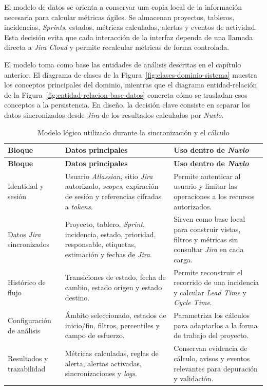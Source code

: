 El modelo de datos se orienta a conservar una copia local de la información necesaria para calcular métricas ágiles. Se almacenan proyectos, tableros, incidencias, \textit{Sprints}, estados, métricas calculadas, alertas y eventos de actividad. Esta decisión evita que cada interacción de la interfaz dependa de una llamada directa a \textit{Jira Cloud} y permite recalcular métricas de forma controlada.

El modelo toma como base las entidades de análisis descritas en el capítulo anterior. El diagrama de clases de la Figura~\ref{fig:clases-dominio-sistema} muestra los conceptos principales del dominio, mientras que el diagrama entidad-relación de la Figura~\ref{fig:entidad-relacion-base-datos} concreta cómo se trasladan esos conceptos a la persistencia. En diseño, la decisión clave consiste en separar los datos sincronizados desde \textit{Jira} de los resultados calculados por \textit{Nuvlo}.

{\renewcommand{\arraystretch}{1.22}\footnotesize
\begin{longtable}{p{3.4cm}p{5.0cm}p{5.0cm}}
\caption{Modelo lógico utilizado durante la sincronización y el cálculo}\label{tab:modelo-datos-sincronizacion}\\
\toprule
\textbf{Bloque} & \textbf{Datos principales} & \textbf{Uso dentro de \textit{Nuvlo}} \\
\midrule
\endfirsthead
\toprule
\textbf{Bloque} & \textbf{Datos principales} & \textbf{Uso dentro de \textit{Nuvlo}} \\
\midrule
\endhead
Identidad y sesión & Usuario \textit{Atlassian}, sitio \textit{Jira} autorizado, \textit{scopes}, expiración de sesión y referencias cifradas a \textit{tokens}. & Permite autenticar al usuario y limitar las operaciones a los recursos autorizados. \\
Datos \textit{Jira} sincronizados & Proyecto, tablero, \textit{Sprint}, incidencia, estado, prioridad, responsable, etiquetas, estimación y fechas de \textit{Jira}. & Sirven como base local para construir vistas, filtros y métricas sin consultar \textit{Jira} en cada carga. \\
Histórico de flujo & Transiciones de estado, fecha de cambio, estado origen y estado destino. & Permite reconstruir el recorrido de una incidencia y calcular \textit{Lead Time} y \textit{Cycle Time}. \\
Configuración de análisis & Ámbito seleccionado, estados de inicio/fin, filtros, percentiles y campo de esfuerzo. & Parametriza los cálculos para adaptarlos a la forma de trabajo del proyecto. \\
Resultados y trazabilidad & Métricas calculadas, reglas de alerta, alertas activadas, sincronizaciones y \textit{logs}. & Conservan evidencia de cálculo, avisos y eventos relevantes para depuración y validación. \\
\bottomrule
\end{longtable}
\vspace{0.45em}
}

